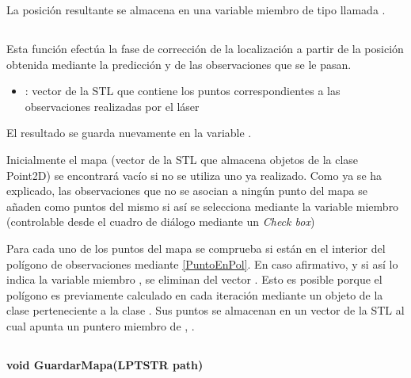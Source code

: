 La posición resultante se almacena en una variable miembro de tipo  llamada .

\subsection{}


Esta función efectúa la fase de corrección de la localización a partir de la posición obtenida mediante la predicción y de las observaciones que se le pasan.

\begin{itemize}
  \item {}: vector de la STL que contiene los puntos correspondientes a las observaciones realizadas por el láser
\end{itemize}

El resultado se guarda nuevamente en la variable .

Inicialmente el mapa (vector de la STL que almacena objetos de la clase Point2D) se encontrará vacío si no se utiliza uno ya realizado. Como ya se ha explicado, las observaciones que no se asocian a ningún punto del mapa se añaden como puntos del mismo si así se selecciona mediante la variable miembro  (controlable desde el cuadro de diálogo mediante un \emph{Check box})

Para cada uno de los puntos del mapa se comprueba si están en el interior del polígono de observaciones mediante \ref{PuntoEnPol}. En caso afirmativo, y si así lo indica la variable miembro , se eliminan del vector . Esto es posible porque el polígono es previamente calculado en cada iteración mediante un objeto de la clase  perteneciente a la clase . Sus puntos se almacenan en un vector de la STL al cual apunta un puntero miembro de , .

\subsection{}\label{GuardarMapa}

\textbf{void GuardarMapa(LPTSTR path)}

